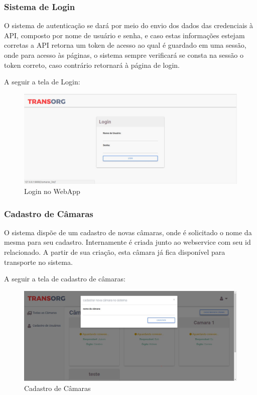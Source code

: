\subsubsection{Sistema de Login}
	O sistema de autenticação se dará por meio do envio dos dados das credenciais à API, composto por nome de usuário e senha, e caso estas informações estejam corretas a API retorna um token de acesso ao qual é guardado em uma sessão, onde para acesso às páginas, o sistema sempre verificará se consta na sessão o token correto, caso contrário retornará à página de login. 
	
	A seguir a tela de Login:

\begin{figure}[H]
\centering
\includegraphics[width=16cm]{figuras/login_software.jpg}
\caption{Login no WebApp}
\end{figure}

\subsubsection{Cadastro de Câmaras}
	O sistema dispõe de um cadastro de novas câmaras, onde é solicitado o nome da mesma para seu cadastro. Internamente é criada junto ao webservice com seu id relacionado. A partir de sua criação, esta câmara já fica disponível para transporte no sistema.
	
	A seguir a tela de cadastro de câmaras:

\begin{figure}[H]
\centering
\includegraphics[width=16cm]{figuras/cadastroCamaras_software.jpg}
\caption{Cadastro de Câmaras}
\end{figure}

